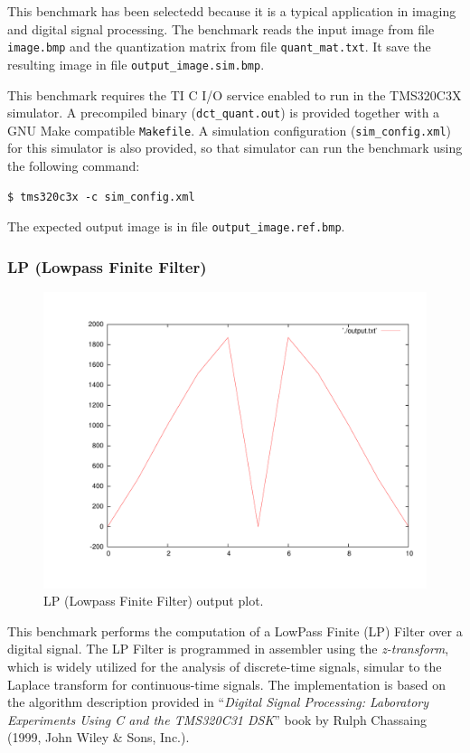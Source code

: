 This benchmark has been selectedd because it is a typical application in imaging and digital signal processing.
The benchmark reads the input image from file \texttt{image.bmp} and the quantization matrix from file \texttt{quant\_mat.txt}.
It save the resulting image in file \texttt{output\_image.sim.bmp}.

This benchmark requires the TI C I/O service enabled to run in the TMS320C3X simulator.
A precompiled binary (\texttt{dct\_quant.out}) is provided together with a GNU Make compatible \texttt{Makefile}.
A simulation configuration (\texttt{sim\_config.xml}) for this simulator is also provided, so that simulator can run the benchmark using the following command:

\begin{verbatim}
$ tms320c3x -c sim_config.xml
\end{verbatim}

The expected output image is in file \texttt{output\_image.ref.bmp}.

\subsubsection{LP (Lowpass Finite Filter)}
\label{tms320c3x_sec:benchmarks_lp}

\begin{figure}[!h]
	\begin{center}
		\includegraphics[width=.8\textwidth]{tms320c3x/fig_lp_output.pdf}
		\caption{\label{fig:tms320c3x_manual_lp_output} LP (Lowpass Finite Filter) output plot.}
	\end{center}
\end{figure}

This benchmark performs the computation of a LowPass Finite (LP) Filter over a digital signal.
The LP Filter is programmed in assembler using the \textit{z-transform}, which is widely utilized for the analysis of discrete-time signals, simular to the Laplace transform for continuous-time signals.
The implementation is based on the algorithm description provided in ``\textit{Digital Signal Processing: Laboratory Experiments Using C and the TMS320C31 DSK}'' book by Rulph Chassaing (1999, John Wiley \& Sons, Inc.).

